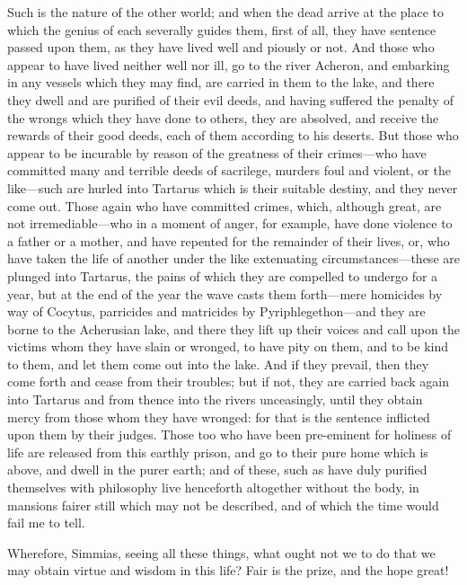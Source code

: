 Such is the nature of the other world; and when the dead arrive at the
place to which the genius of each severally guides them, first of all,
they have sentence passed upon them, as they have lived well and piously
or not. And those who appear to have lived neither well nor ill, go to the
river Acheron, and embarking in any vessels which they may find, are
carried in them to the lake, and there they dwell and are purified of
their evil deeds, and having suffered the penalty of the wrongs which they
have done to others, they are absolved, and receive the rewards of their
good deeds, each of them according to his deserts. But those who appear to
be incurable by reason of the greatness of their crimes—who have
committed many and terrible deeds of sacrilege, murders foul and violent,
or the like—such are hurled into Tartarus which is their suitable
destiny, and they never come out. Those again who have committed crimes,
which, although great, are not irremediable—who in a moment of
anger, for example, have done violence to a father or a mother, and have
repented for the remainder of their lives, or, who have taken the life of
another under the like extenuating circumstances—these are plunged
into Tartarus, the pains of which they are compelled to undergo for a
year, but at the end of the year the wave casts them forth—mere
homicides by way of Cocytus, parricides and matricides by Pyriphlegethon—and
they are borne to the Acherusian lake, and there they lift up their voices
and call upon the victims whom they have slain or wronged, to have pity on
them, and to be kind to them, and let them come out into the lake. And if
they prevail, then they come forth and cease from their troubles; but if
not, they are carried back again into Tartarus and from thence into the
rivers unceasingly, until they obtain mercy from those whom they have
wronged: for that is the sentence inflicted upon them by their judges.
Those too who have been pre-eminent for holiness of life are released from
this earthly prison, and go to their pure home which is above, and dwell
in the purer earth; and of these, such as have duly purified themselves
with philosophy live henceforth altogether without the body, in mansions
fairer still which may not be described, and of which the time would fail
me to tell.

Wherefore, Simmias, seeing all these things, what ought not we to do that
we may obtain virtue and wisdom in this life? Fair is the prize, and the
hope great!

